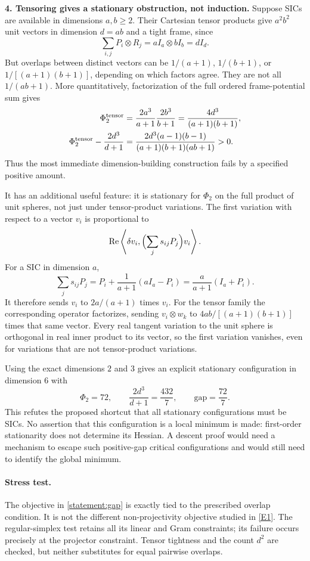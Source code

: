 \documentclass[11pt,a4paper]{article}
\newcommand{\eref}[2]{\hyperlink{extra:#1:#2}{[E#2]}}
\numberwithin{equation}{section}
\begin{document}
\textbf{4. Tensoring gives a stationary obstruction, not induction.}
Suppose SICs are available in dimensions $a,b\geq2$. Their Cartesian
tensor products give $a^2b^2$ unit vectors in dimension $d=ab$ and a
tight frame, since
\[
 \sum_{i,j}P_i\otimes R_j=aI_a\otimes bI_b=dI_d.
\]
But overlaps between distinct vectors can be $1/(a+1)$, $1/(b+1)$,
or $1/[(a+1)(b+1)]$, depending on which factors agree. They are not all
$1/(ab+1)$. More quantitatively, factorization of the full ordered
frame-potential sum gives
\begin{align}
 \Phi_2^{\rm tensor}
    &=\frac{2a^3}{a+1}\frac{2b^3}{b+1}
      =\frac{4d^3}{(a+1)(b+1)},\notag\\
 \Phi_2^{\rm tensor}-\frac{2d^3}{d+1}
    &=\frac{2d^3(a-1)(b-1)}{(a+1)(b+1)(ab+1)}>0.
       \label{statement:tensorgap}
\end{align}
Thus the most immediate dimension-building construction fails by a
specified positive amount.

It has an additional useful feature: it is stationary for $\Phi_2$ on
the full product of unit spheres, not just under tensor-product variations.
The first variation with respect to a vector $v_i$ is proportional to
\[
 \operatorname{Re}\left\langle\delta v_i,
             \Bigl(\sum_j s_{ij}P_j\Bigr)v_i\right\rangle.
\]
For a SIC in dimension $a$,
\[
 \sum_j s_{ij}P_j
 =P_i+\frac1{a+1}(aI_a-P_i)
 =\frac{a}{a+1}(I_a+P_i).
\]
It therefore sends $v_i$ to $2a/(a+1)$ times $v_i$. For the tensor
family the corresponding operator factorizes, sending $v_i\otimes w_k$
to
$4ab/[(a+1)(b+1)]$ times that same vector. Every real tangent variation
to the unit sphere is orthogonal in real inner product to its vector,
so the first variation vanishes, even for variations that are not
tensor-product variations.

Using the exact dimensions $2$ and $3$ gives an explicit stationary
configuration in dimension $6$ with
\begin{equation}\label{statement:six}
 \Phi_2=72,\qquad \frac{2d^3}{d+1}=\frac{432}{7},\qquad
 \text{gap}=\frac{72}{7}.
\end{equation}
This refutes the proposed shortcut that all stationary configurations
must be SICs. No assertion that this configuration is a local minimum
is made: first-order stationarity does not determine its Hessian.
A descent proof would need a mechanism to escape such positive-gap
critical configurations and would still need to identify the global
minimum.

\paragraph{Stress test.}
The objective in \eqref{statement:gap} is exactly tied to the prescribed
overlap condition. It is not the different non-projectivity objective
studied in \eref{statement}{1}. The regular-simplex test retains all its
linear and Gram constraints; its failure occurs precisely at the
projector constraint. Tensor tightness and the count $d^2$ are checked,
but neither substitutes for equal pairwise overlaps.
\end{document}
